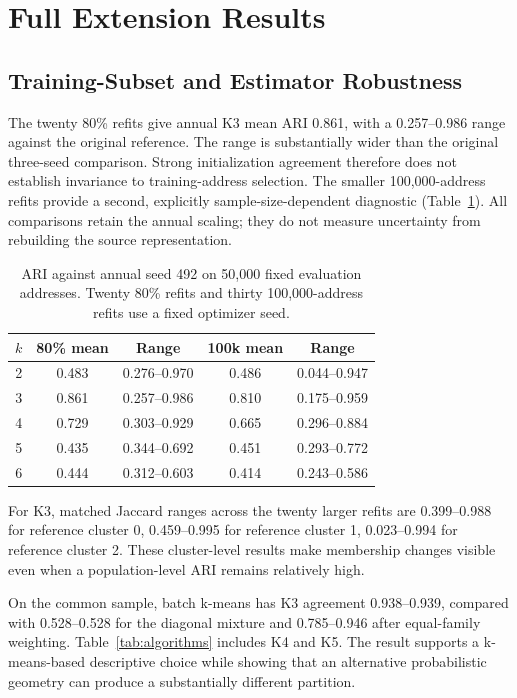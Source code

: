 \documentclass[journal,letterpaper]{IEEEtran}
\begin{document}
\section{Full Extension Results}\subsection{Training-Subset and Estimator Robustness}
The twenty 80\% refits give annual K3 mean ARI 0.861, with a 0.257--0.986 range against the original reference. The range is substantially wider than the original three-seed comparison. Strong initialization agreement therefore does not establish invariance to training-address selection. The smaller 100,000-address refits provide a second, explicitly sample-size-dependent diagnostic (Table~\ref{tab:resampling}). All comparisons retain the annual scaling; they do not measure uncertainty from rebuilding the source representation.

\begin{table}[t]
\centering\footnotesize
\caption{ARI against annual seed 492 on 50,000 fixed evaluation addresses. Twenty 80\% refits and thirty 100,000-address refits use a fixed optimizer seed.}
\label{tab:resampling}
\begin{tabular}{rcccc}
\toprule
$k$ & 80\% mean & Range & 100k mean & Range \\
\midrule
2 & 0.483 & 0.276--0.970 & 0.486 & 0.044--0.947 \\
3 & 0.861 & 0.257--0.986 & 0.810 & 0.175--0.959 \\
4 & 0.729 & 0.303--0.929 & 0.665 & 0.296--0.884 \\
5 & 0.435 & 0.344--0.692 & 0.451 & 0.293--0.772 \\
6 & 0.444 & 0.312--0.603 & 0.414 & 0.243--0.586 \\
\bottomrule
\end{tabular}
\end{table}
For K3, matched Jaccard ranges across the twenty larger refits are 0.399--0.988 for reference cluster 0, 0.459--0.995 for reference cluster 1, 0.023--0.994 for reference cluster 2. These cluster-level results make membership changes visible even when a population-level ARI remains relatively high.

On the common sample, batch k-means has K3 agreement 0.938--0.939, compared with 0.528--0.528 for the diagonal mixture and 0.785--0.946 after equal-family weighting. Table~\ref{tab:algorithms} includes K4 and K5. The result supports a k-means-based descriptive choice while showing that an alternative probabilistic geometry can produce a substantially different partition.
\end{document}
